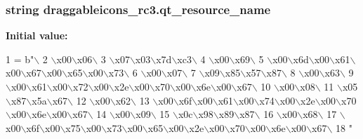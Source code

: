 \subsubsection[{qt\+\_\+resource\+\_\+name}]{\setlength{\rightskip}{0pt plus 5cm}string draggableicons\+\_\+rc3.\+qt\+\_\+resource\+\_\+name}\label{namespacedraggableicons__rc3_a26d52fcc968df95beabbbd762b12a6af}
{\bfseries Initial value\+:}
\begin{DoxyCode}
1 = b\textcolor{stringliteral}{"\(\backslash\)}
2 \textcolor{stringliteral}{\(\backslash\)x00\(\backslash\)x06\(\backslash\)}
3 \textcolor{stringliteral}{\(\backslash\)x07\(\backslash\)x03\(\backslash\)x7d\(\backslash\)xc3\(\backslash\)}
4 \textcolor{stringliteral}{\(\backslash\)x00\(\backslash\)x69\(\backslash\)}
5 \textcolor{stringliteral}{\(\backslash\)x00\(\backslash\)x6d\(\backslash\)x00\(\backslash\)x61\(\backslash\)x00\(\backslash\)x67\(\backslash\)x00\(\backslash\)x65\(\backslash\)x00\(\backslash\)x73\(\backslash\)}
6 \textcolor{stringliteral}{\(\backslash\)x00\(\backslash\)x07\(\backslash\)}
7 \textcolor{stringliteral}{\(\backslash\)x09\(\backslash\)x85\(\backslash\)x57\(\backslash\)x87\(\backslash\)}
8 \textcolor{stringliteral}{\(\backslash\)x00\(\backslash\)x63\(\backslash\)}
9 \textcolor{stringliteral}{\(\backslash\)x00\(\backslash\)x61\(\backslash\)x00\(\backslash\)x72\(\backslash\)x00\(\backslash\)x2e\(\backslash\)x00\(\backslash\)x70\(\backslash\)x00\(\backslash\)x6e\(\backslash\)x00\(\backslash\)x67\(\backslash\)}
10 \textcolor{stringliteral}{\(\backslash\)x00\(\backslash\)x08\(\backslash\)}
11 \textcolor{stringliteral}{\(\backslash\)x05\(\backslash\)x87\(\backslash\)x5a\(\backslash\)x67\(\backslash\)}
12 \textcolor{stringliteral}{\(\backslash\)x00\(\backslash\)x62\(\backslash\)}
13 \textcolor{stringliteral}{\(\backslash\)x00\(\backslash\)x6f\(\backslash\)x00\(\backslash\)x61\(\backslash\)x00\(\backslash\)x74\(\backslash\)x00\(\backslash\)x2e\(\backslash\)x00\(\backslash\)x70\(\backslash\)x00\(\backslash\)x6e\(\backslash\)x00\(\backslash\)x67\(\backslash\)}
14 \textcolor{stringliteral}{\(\backslash\)x00\(\backslash\)x09\(\backslash\)}
15 \textcolor{stringliteral}{\(\backslash\)x0c\(\backslash\)x98\(\backslash\)x89\(\backslash\)x87\(\backslash\)}
16 \textcolor{stringliteral}{\(\backslash\)x00\(\backslash\)x68\(\backslash\)}
17 \textcolor{stringliteral}{\(\backslash\)x00\(\backslash\)x6f\(\backslash\)x00\(\backslash\)x75\(\backslash\)x00\(\backslash\)x73\(\backslash\)x00\(\backslash\)x65\(\backslash\)x00\(\backslash\)x2e\(\backslash\)x00\(\backslash\)x70\(\backslash\)x00\(\backslash\)x6e\(\backslash\)x00\(\backslash\)x67\(\backslash\)}
18 \textcolor{stringliteral}{"}
\end{DoxyCode}
\hypertarget{namespacedraggableicons__rc3_ac53880968b529f8f839055818d51300b}{}
